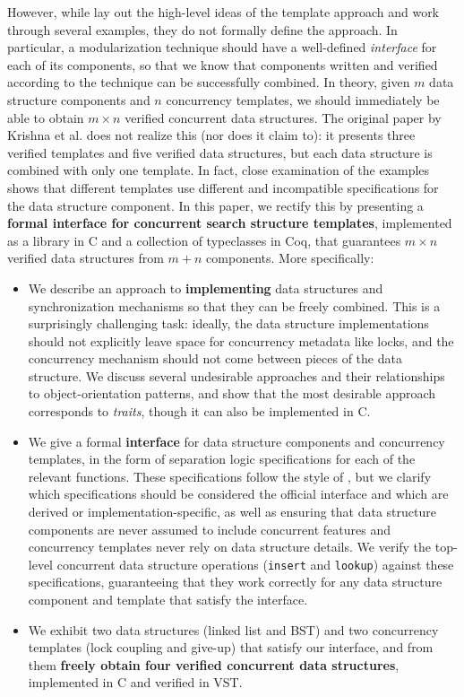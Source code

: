 \documentclass[sigplan,screen]{acmart}
\begin{document}
However, while \citet{templates} lay out the high-level ideas of the template approach and work through several examples, they do not formally define the approach. In particular, a modularization technique should have a well-defined \emph{interface} for each of its components, so that we know that components written and verified according to the technique can be successfully combined. In theory, given $m$ data structure components and $n$ concurrency templates, we should immediately be able to obtain $m \times n$ verified concurrent data structures. The original paper by Krishna et al. does not realize this (nor does it claim to): it presents three verified templates and five verified data structures, but each data structure is combined with only one template. In fact, close examination of the examples shows that different templates use different and incompatible specifications for the data structure component. In this paper, we rectify this by presenting a \textbf{formal interface for concurrent search structure templates}, implemented as a library in C and a collection of typeclasses in Coq, that guarantees $m \times n$ verified data structures from $m + n$ components. More specifically:
\begin{itemize}
\item We describe an approach to \textbf{implementing} data structures and synchronization mechanisms so that they can be freely combined. This is a surprisingly challenging task: ideally, the data structure implementations should not explicitly leave space for concurrency metadata like locks, and the concurrency mechanism should not come between pieces of the data structure. We discuss several undesirable approaches and their relationships to object-orientation patterns, and show that the most desirable approach corresponds to \emph{traits}, though it can also be implemented in C.
\item We give a formal \textbf{interface} for data structure components and concurrency templates, in the form of separation logic specifications for each of the relevant functions. These specifications follow the style of \citet{templates}, but we clarify which specifications should be considered the official interface and which are derived or implementation-specific, as well as ensuring that data structure components are never assumed to include concurrent features and concurrency templates never rely on data structure details. We verify the top-level concurrent data structure operations (\lstinline{insert} and \lstinline{lookup}) against these specifications, guaranteeing that they work correctly for any data structure component and template that satisfy the interface.
\item We exhibit two data structures (linked list and BST) and two concurrency templates (lock coupling and give-up) that satisfy our interface, and from them \textbf{freely obtain four verified concurrent data structures}, implemented in C and verified in VST. %
\end{itemize}
\end{document}
